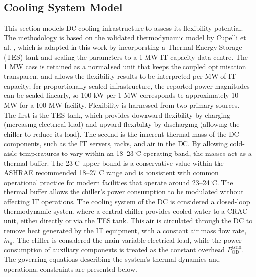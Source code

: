 \documentclass[lettersize,journal]{IEEEtran}
\newcommand{\rev}[1]{\textcolor{blue!70!black}{#1}}
\begin{document}
\subsection{Cooling System Model} \label{sec: Cooling Infrastructure Flexibility} 
This section models DC cooling infrastructure to assess its flexibility potential. The methodology is based on the validated thermodynamic model by Cupelli et al. \cite{cupelli2018data}, which \rev{is adapted in this work by incorporating a Thermal Energy Storage (TES) tank and scaling the parameters to a 1 MW IT-capacity data centre. The 1 MW case is retained as a normalised unit that keeps the coupled optimisation transparent and allows the flexibility results to be interpreted per MW of IT capacity; for proportionally scaled infrastructure, the reported power magnitudes can be scaled linearly, so 100 kW per 1 MW corresponds to approximately 10 MW for a 100 MW facility.}
Flexibility is harnessed from two primary sources. \rev{The first is} the TES tank, which provides downward flexibility by charging (increasing electrical load) and upward flexibility by discharging (allowing the chiller to reduce its load). The second is the inherent thermal mass of the DC components, such as the IT servers, racks, and air in the DC. \rev{By allowing cold-aisle temperatures to vary within an 18--23$^\circ$C operating band, the masses act as a thermal buffer. The 23$^\circ$C upper bound is a conservative value within the ASHRAE recommended 18--27$^\circ$C range and is consistent with common operational practice for modern facilities that operate around 23--24$^\circ$C.} The thermal buffer allows the chiller's power consumption to be modulated without affecting IT operations.
The cooling system of the DC is considered a closed-loop thermodynamic system where a central chiller provides cooled water to a CRAC unit, either directly or via the TES tank. This air is circulated through the DC to remove heat generated by the IT equipment, with a constant air mass flow rate, $\dot{m}_{a}$. The chiller is considered the main variable electrical load, while the power consumption of auxiliary components is treated as \rev{the constant overhead $P^{\mathrm{Grid}}_{\mathrm{OD}}$}. The governing equations describing the system's thermal dynamics and operational constraints are presented below.
\end{document}
